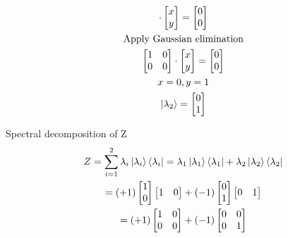 \documentclass[]{article}
\begin{document}
\begin{enumerate}
\begin{enumerate}
\begin{minipage}{.49\linewidth}
\begin{gather*}
              \cdot 
              \begin{bmatrix}
                x\\ y
              \end{bmatrix}
              = \begin{bmatrix}
                0\\0
              \end{bmatrix}\\
              \text{Apply Gaussian elimination}\\
              \begin{bmatrix}
                1 & 0\\
                0 & 0
              \end{bmatrix}
              \cdot 
              \begin{bmatrix}
                x\\ y
              \end{bmatrix}
              = \begin{bmatrix}
                0\\0
              \end{bmatrix}\\
              x = 0, y = 1\\
              \ket{\lambda_2} = \begin{bmatrix}
                0\\1
              \end{bmatrix}
            \end{gather*}
          \end{minipage}

          Spectral decomposition of Z
          \begin{gather*}
            Z = \sum_{i=1}^{2} \lambda_i \ket{\lambda_i}\bra{\lambda_i}
            = \lambda_1 \ket{\lambda_1}\bra{\lambda_1} + \lambda_2 \ket{\lambda_2}\bra{\lambda_2}\\
            = (+1) \begin{bmatrix}1\\0\end{bmatrix} \begin{bmatrix}1&0\end{bmatrix}
            + (-1) \begin{bmatrix}0\\1\end{bmatrix} \begin{bmatrix}0&1\end{bmatrix}\\
            = (+1) \begin{bmatrix}1&0\\0&0\end{bmatrix} + (-1) \begin{bmatrix}0&0\\0&1\end{bmatrix}
          \end{gather*}


\end{enumerate}
\end{enumerate}
\end{document}
